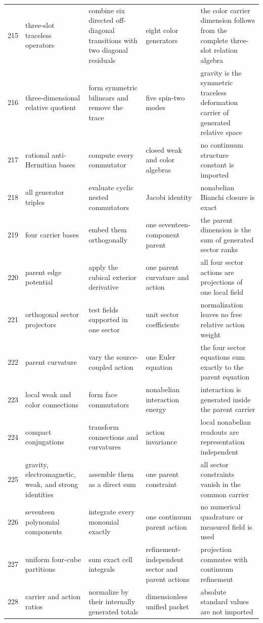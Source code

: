 \documentclass[11pt]{article}
\numberwithin{equation}{section}
\theoremstyle{remark}
\begin{document}
\begin{landscape}
\begin{longtable}{p{0.65cm}p{3.5cm}p{4.0cm}p{4.0cm}p{4.6cm}}
215&three-slot traceless operators&combine six directed off-diagonal transitions with two diagonal residuals&eight color generators&the color carrier dimension follows from the complete three-slot relation algebra\\
216&three-dimensional relative quotient&form symmetric bilinears and remove the trace&five spin-two modes&gravity is the symmetric traceless deformation carrier of generated relative space\\
217&rational anti-Hermitian bases&compute every commutator&closed weak and color algebras&no continuum structure constant is imported\\
218&all generator triples&evaluate cyclic nested commutators&Jacobi identity&nonabelian Bianchi closure is exact\\
219&four carrier bases&embed them orthogonally&one seventeen-component parent&the parent dimension is the sum of generated sector ranks\\
220&parent edge potential&apply the cubical exterior derivative&one parent curvature and action&all four sector actions are projections of one local field\\
221&orthogonal sector projectors&test fields supported in one sector&unit sector coefficients&normalization leaves no free relative action weight\\
222&parent curvature&vary the source-coupled action&one Euler equation&the four sector equations sum exactly to the parent equation\\
223&local weak and color connections&form face commutators&nonabelian interaction energy&interaction is generated inside the parent carrier\\
224&compact conjugations&transform connections and curvatures&action invariance&local nonabelian readouts are representation independent\\
225&gravity, electromagnetic, weak, and strong identities&assemble them as a direct sum&one parent constraint&all sector constraints vanish in the common carrier\\
226&seventeen polynomial components&integrate every monomial exactly&one continuum parent action&no numerical quadrature or measured field is used\\
227&uniform four-cube partitions&sum exact cell integrals&refinement-independent sector and parent actions&projection commutes with continuum refinement\\
228&carrier and action ratios&normalize by their internally generated totals&dimensionless unified packet&absolute standard values are not imported\\

\end{longtable}
\end{landscape}
\end{document}
